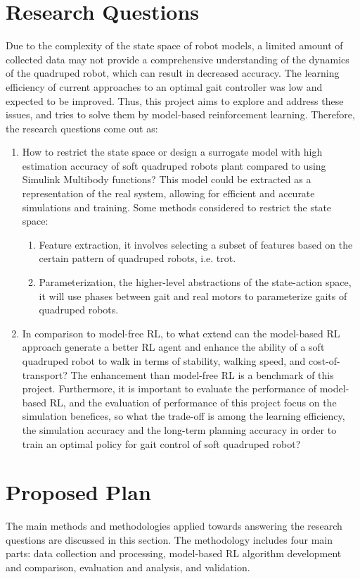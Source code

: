 \section{Research Questions} 
Due to the complexity of the state space of robot models, a limited amount of collected data may not provide a comprehensive understanding of the dynamics of the quadruped robot, which can result in decreased accuracy. The learning efficiency of current approaches to an optimal gait controller was low and expected to be improved. Thus, this project aims to explore and address these issues, and tries to solve them by model-based reinforcement learning. Therefore, the research questions come out as: 
\begin{enumerate}
    \item How to restrict the state space or design a surrogate model with high estimation accuracy of soft quadruped robots plant compared to using Simulink Multibody functions? This model could be extracted as a representation of the real system, allowing for efficient and accurate simulations and training. Some methods considered to restrict the state space:
    \begin{enumerate}
        \item Feature extraction, it involves selecting a subset of features based on the certain pattern of quadruped robots, i.e. trot.
        \item Parameterization, the higher-level abstractions of the state-action space, it will use phases between gait and real motors to parameterize gaits of quadruped robots.
    \end{enumerate}
    \item In comparison to model-free \ac{RL}, to what extend can the model-based \ac{RL} approach generate a better \ac{RL} agent and enhance the ability of a soft quadruped robot to walk in terms of stability, walking speed, and cost-of-transport? The enhancement than model-free \ac{RL} is a benchmark of this project. Furthermore, it is important to evaluate the performance of model-based \ac{RL}, and the evaluation of performance of this project focus on the simulation benefices, so what the trade-off is among the learning efficiency, the simulation accuracy and the long-term planning accuracy in order to train an optimal policy for gait control of soft quadruped robot?
\end{enumerate}

\section{Proposed Plan}
The main methods and methodologies applied towards answering the research questions are discussed in this section. 
The methodology includes four main parts: data collection and processing, model-based \ac{RL} algorithm development and comparison, evaluation and analysis, and validation.

